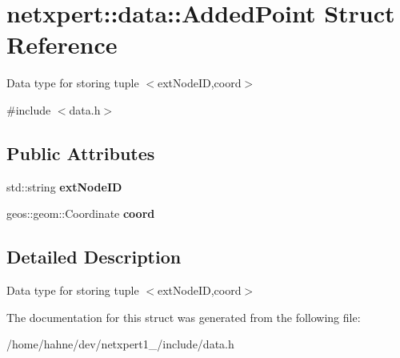\hypertarget{structnetxpert_1_1data_1_1AddedPoint}{}\section{netxpert\+:\+:data\+:\+:Added\+Point Struct Reference}
\label{structnetxpert_1_1data_1_1AddedPoint}


Data type for storing tuple $<$ext\+Node\+ID,coord$>$  




{\ttfamily \#include $<$data.\+h$>$}

\subsection*{Public Attributes}
\begin{DoxyCompactItemize}
\item 
std\+::string {\bfseries ext\+Node\+ID}\hypertarget{structnetxpert_1_1data_1_1AddedPoint_a24722fa3f40ab5356bcb5ac18160ac46}{}\label{structnetxpert_1_1data_1_1AddedPoint_a24722fa3f40ab5356bcb5ac18160ac46}

\item 
geos\+::geom\+::\+Coordinate {\bfseries coord}\hypertarget{structnetxpert_1_1data_1_1AddedPoint_a66a7bc1f84febd0080b1f0fe963fb375}{}\label{structnetxpert_1_1data_1_1AddedPoint_a66a7bc1f84febd0080b1f0fe963fb375}

\end{DoxyCompactItemize}


\subsection{Detailed Description}
Data type for storing tuple $<$ext\+Node\+ID,coord$>$ 

The documentation for this struct was generated from the following file\+:\begin{DoxyCompactItemize}
\item 
/home/hahne/dev/netxpert1\+\_/include/data.\+h\end{DoxyCompactItemize}
